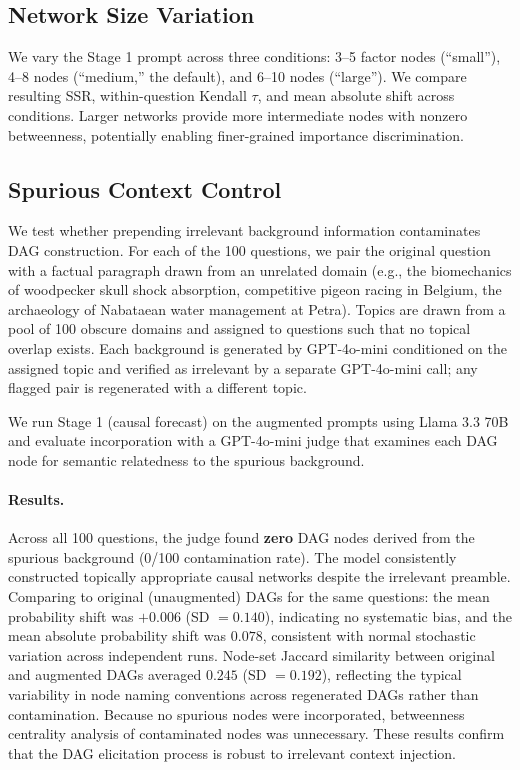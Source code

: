 \documentclass[11pt]{article}
\begin{document}
\subsection{Network Size Variation}

We vary the Stage 1 prompt across three conditions: 3--5 factor nodes (``small''), 4--8 nodes (``medium,'' the default), and 6--10 nodes (``large''). We compare resulting SSR, within-question Kendall $\tau$, and mean absolute shift across conditions. Larger networks provide more intermediate nodes with nonzero betweenness, potentially enabling finer-grained importance discrimination.

\subsection{Spurious Context Control}

We test whether prepending irrelevant background information contaminates DAG construction. For each of the 100 questions, we pair the original question with a factual paragraph drawn from an unrelated domain (e.g., the biomechanics of woodpecker skull shock absorption, competitive pigeon racing in Belgium, the archaeology of Nabataean water management at Petra). Topics are drawn from a pool of 100 obscure domains and assigned to questions such that no topical overlap exists. Each background is generated by GPT-4o-mini conditioned on the assigned topic and verified as irrelevant by a separate GPT-4o-mini call; any flagged pair is regenerated with a different topic.

We run Stage 1 (causal forecast) on the augmented prompts using Llama 3.3 70B and evaluate incorporation with a GPT-4o-mini judge that examines each DAG node for semantic relatedness to the spurious background.

\paragraph{Results.} Across all 100 questions, the judge found \textbf{zero} DAG nodes derived from the spurious background (0/100 contamination rate). The model consistently constructed topically appropriate causal networks despite the irrelevant preamble. Comparing to original (unaugmented) DAGs for the same questions: the mean probability shift was $+0.006$ (SD $= 0.140$), indicating no systematic bias, and the mean absolute probability shift was $0.078$, consistent with normal stochastic variation across independent runs. Node-set Jaccard similarity between original and augmented DAGs averaged $0.245$ (SD $= 0.192$), reflecting the typical variability in node naming conventions across regenerated DAGs rather than contamination. Because no spurious nodes were incorporated, betweenness centrality analysis of contaminated nodes was unnecessary. These results confirm that the DAG elicitation process is robust to irrelevant context injection.
\end{document}
